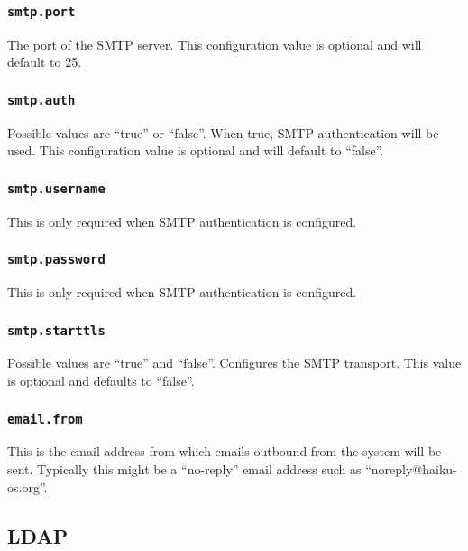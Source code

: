 \subsubsection{\tt smtp.port}

The port of the SMTP server.  This configuration value is optional and will default to 25.

\subsubsection{\tt smtp.auth}

Possible values are ``true'' or ``false''.  When true, SMTP authentication will be used.  This configuration value is optional and will default to ``false''.

\subsubsection{\tt smtp.username}

This is only required when SMTP authentication is configured.

\subsubsection{\tt smtp.password}

This is only required when SMTP authentication is configured.

\subsubsection{\tt smtp.starttls}

Possible values are ``true'' and ``false''.  Configures the SMTP transport.  This value is optional and defaults to ``false''.

\subsubsection{\tt email.from}

This is the email address from which emails outbound from the system will be sent.  Typically this might be a ``no-reply'' email address such as ``noreply@haiku-os.org''.

\subsection{LDAP}


